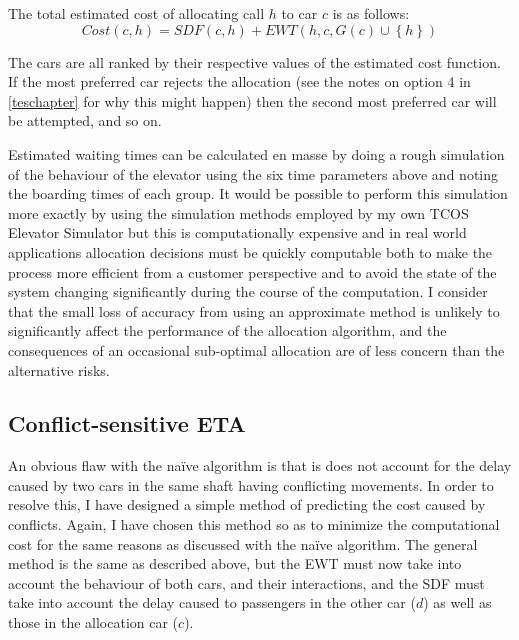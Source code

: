 \documentclass{UoYCSproject}
\begin{document}
The total estimated cost of allocating call $h$ to car $c$ is as follows:
\[ Cost(c, h) = SDF(c, h) + EWT(h, c, G(c) \cup \left\{ h \right\}) \]

The cars are all ranked by their respective values of the estimated cost function.  If the most preferred car rejects the allocation (see the notes on option 4 in \autoref{teschapter} for why this might happen) then the second most preferred car will be attempted, and so on.

Estimated waiting times can be calculated en masse by doing a rough simulation of the behaviour of the elevator using the six time parameters above and noting the boarding times of each group.  It would be possible to perform this simulation more exactly by using the simulation methods employed by my own TCOS Elevator Simulator but this is computationally expensive and in real world applications allocation decisions must be quickly computable both to make the process more efficient from a customer perspective and to avoid the state of the system changing significantly during the course of the computation.  I consider that the small loss of accuracy from using an approximate method is unlikely to significantly affect the performance of the allocation algorithm, and the consequences of an occasional sub-optimal allocation are of less concern than the alternative risks.

\subsection{Conflict-sensitive ETA}
\label{algETAconflict}

An obvious flaw with the na\"{i}ve algorithm is that is does not account for the delay caused by two cars in the same shaft having conflicting movements.  In order to resolve this, I have designed a simple method of predicting the cost caused by conflicts.  Again, I have chosen this method so as to minimize the computational cost for the same reasons as discussed with the na\"{i}ve algorithm.  The general method is the same as described above, but the EWT must now take into account the behaviour of both cars, and their interactions, and the SDF must take into account the delay caused to passengers in the other car ($d$) as well as those in the allocation car ($c$).
\end{document}
